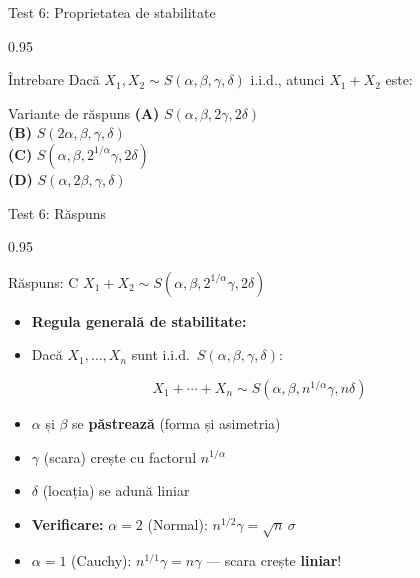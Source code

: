 \documentclass[9pt, aspectratio=169, t]{beamer}
\begin{document}
\begin{frame}{Test 6: Proprietatea de stabilitate}
\begin{cminipage}{0.95\textwidth}
    \begin{alertblock}{Întrebare}
        Dacă $X_1, X_2 \sim S(\alpha, \beta, \gamma, \delta)$ i.i.d., atunci $X_1 + X_2$ este:
    \end{alertblock}

    \vspace{0.5cm}
    \begin{block}{Variante de răspuns}
    \textcolor{MainBlue}{\textbf{(A)}} $S(\alpha, \beta, 2\gamma, 2\delta)$\\[3pt]
    \textcolor{MainBlue}{\textbf{(B)}} $S(2\alpha, \beta, \gamma, \delta)$\\[3pt]
    \textcolor{MainBlue}{\textbf{(C)}} $S(\alpha, \beta, 2^{1/\alpha}\gamma, 2\delta)$\\[3pt]
    \textcolor{MainBlue}{\textbf{(D)}} $S(\alpha, 2\beta, \gamma, \delta)$
    \end{block}
\end{cminipage}
\end{frame}

\begin{frame}{Test 6: Răspuns}
\begin{cminipage}{0.95\textwidth}
    \begin{exampleblock}{Răspuns: C}
        $X_1 + X_2 \sim S(\alpha, \beta, 2^{1/\alpha}\gamma, 2\delta)$
    \end{exampleblock}

    \vspace{0.2cm}

    \begin{itemize}\setlength{\itemsep}{0pt}
        \item \textbf{Regula generală de stabilitate:}
        \item Dacă $X_1, \ldots, X_n$ sunt i.i.d.\ $S(\alpha, \beta, \gamma, \delta)$:
    \end{itemize}
    $$X_1 + \cdots + X_n \sim S(\alpha, \beta, n^{1/\alpha}\gamma, n\delta)$$
    \begin{itemize}\setlength{\itemsep}{0pt}
        \item $\alpha$ și $\beta$ se \textbf{păstrează} (forma și asimetria)
        \item $\gamma$ (scara) crește cu factorul $n^{1/\alpha}$
        \item $\delta$ (locația) se adună liniar
        \item \textbf{Verificare:} $\alpha = 2$ (Normal): $n^{1/2}\gamma = \sqrt{n}\,\sigma$ \correct
        \item $\alpha = 1$ (Cauchy): $n^{1/1}\gamma = n\gamma$ --- scara crește \textbf{liniar}!
    \end{itemize}
\end{cminipage}
\end{frame}
\end{document}
